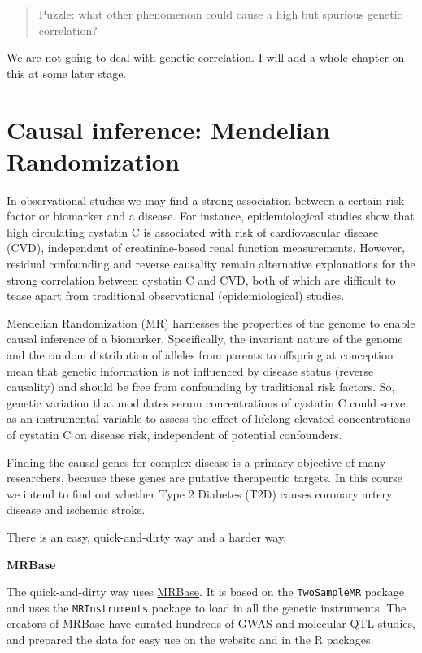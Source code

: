 \documentclass[
]{book}
\newcommand{\passthrough}[1]{#1}
\begin{document}
\begin{quote}
Puzzle: what other phenomenom could cause a high but spurious genetic correlation?
\end{quote}

We are not going to deal with genetic correlation. I will add a whole chapter on this at some later stage.

\hypertarget{causal-inference-mendelian-randomization}{%
\section{Causal inference: Mendelian Randomization}\label{causal-inference-mendelian-randomization}}

In observational studies we may find a strong association between a certain risk factor or biomarker and a disease. For instance, epidemiological studies show that high circulating cystatin C is associated with risk of cardiovascular disease (CVD), independent of creatinine-based renal function measurements\citep{vanderlaan2016}. However, residual confounding and reverse causality remain alternative explanations for the strong correlation between cystatin C and CVD, both of which are difficult to tease apart from traditional observational (epidemiological) studies.

Mendelian Randomization (MR) harnesses the properties of the genome to enable causal inference of a biomarker. Specifically, the invariant nature of the genome and the random distribution of alleles from parents to offspring at conception mean that genetic information is not influenced by disease status (reverse causality) and should be free from confounding by traditional risk factors\citep{vanderlaan2016}. So, genetic variation that modulates serum concentrations of cystatin C could serve as an instrumental variable to assess the effect of lifelong elevated concentrations of cystatin C on disease risk, independent of potential confounders\citep{vanderlaan2016}.

Finding the causal genes for complex disease is a primary objective of many researchers, because these genes are putative therapeutic targets. In this course we intend to find out whether Type 2 Diabetes (T2D) causes coronary artery disease and ischemic stroke.

There is an easy, quick-and-dirty way and a harder way.

\textbf{MRBase}

The quick-and-dirty way uses \href{http://www.mrbase.org/}{MRBase}. It is based on the \passthrough{\lstinline!TwoSampleMR!} package and uses the \passthrough{\lstinline!MRInstruments!} package to load in all the genetic instruments. The creators of MRBase have curated hundreds of GWAS and molecular QTL studies, and prepared the data for easy use on the website and in the R packages.
\end{document}
